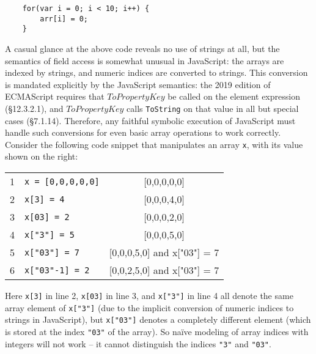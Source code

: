 \documentclass[sigplan,screen]{acmart}
\begin{document}
\begin{center}
	\begin{minipage}{\linewidth}
		\begin{verbatim}
    for(var i = 0; i < 10; i++) {
        arr[i] = 0;
    }
		\end{verbatim}
	\end{minipage}
\end{center}



A casual glance at the above code reveals no use of strings at all, but the semantics of field access is somewhat unusual in JavaScript: the arrays are indexed by strings, and numeric indices are converted to strings. This conversion is mandated explicitly by the JavaScript semantics: the 2019 edition of ECMAScript \cite{ecmascript2019ecmascript} requires that $ToPropertyKey$ be called on the element expression (\S{12.3.2.1}), and $ToPropertyKey$ calls {\tt{ToString}} on that value in all but special cases (\S{7.1.14}). Therefore, any faithful symbolic execution of JavaScript must handle such conversions for even basic array operations to work correctly. Consider the following code snippet that manipulates an array \texttt{x}, with its value shown on the right:


\begin{center}
\begin{tabular}{l|l|c}
1&{\tt{x = [0,0,0,0,0]}} & [0,0,0,0,0]\\
2&{\tt{x[3] = 4}} & [0,0,0,4,0] \\
3&{\tt{x[03] = 2}} & [0,0,0,2,0] \\
4&{\tt{x["3"] = 5}} & [0,0,0,5,0] \\
5&{\tt{x["03"] = 7}} & [0,0,0,5,0] and x["03"] = 7\\
6&{\tt{x["03"-1] = 2}} & [0,0,2,5,0] and x["03"] = 7\\
\end{tabular}
\end{center}

Here \texttt{x[3]} in line 2, \texttt{x[03]} in line 3, and \texttt{x["3"]} in line 4 all denote the same array element of \texttt{x["3"]} (due to the implicit conversion of numeric indices to strings in JavaScript), but \texttt{x["03"]} denotes a completely different element (which is stored at the index \texttt{"03"} of the array). So na\"ive modeling of array indices with integers will not work -- it cannot distinguish the indices \texttt{"3"} and \texttt{"03"}. 
\end{document}
